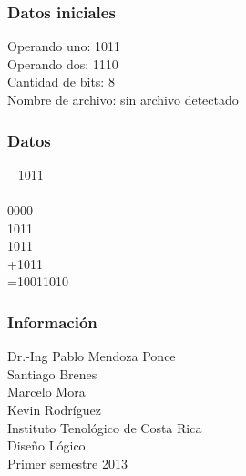 \documentclass{beamer}
\begin{document}
\begin{frame}\frametitle{Datos iniciales}Operando uno: 1011\\Operando dos: 1110\\Cantidad de bits: 8\\Nombre de archivo: sin archivo detectado\end{frame}
\begin{frame}\frametitle{Datos}\,\,\,\,\,1011\\\\0000\\1011\\1011\\+1011\\=10011010\end{frame}
\begin{frame}\frametitle{Informaci\'on}Dr.-Ing Pablo Mendoza Ponce \\ Santiago Brenes \\ Marcelo Mora \\ Kevin Rodr\'iguez \\ Instituto Tenol\'ogico de Costa Rica \\ Dise\~{n}o L\'ogico \\ Primer semestre 2013\end{frame}
\end{document}
